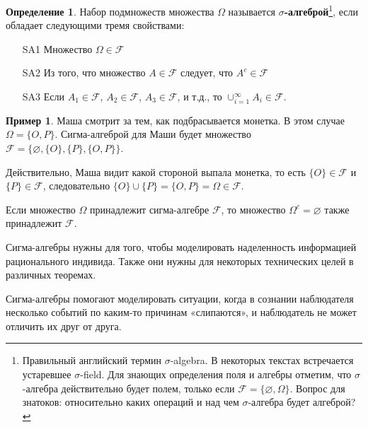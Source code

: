 \documentclass[pdftex, 12pt, a4paper]{article}
\def\F{\ensuremath{\mathcal{F}}} %
\def\s{\ensuremath{\sigma}}
\def \Om{\Omega}
\theoremstyle{definition} %
\newtheorem*{mydef}{Определение}
\newtheorem{myex}{Пример}
\numberwithin{problem}{section}
\newcommand{\indef}[1]{\textbf{#1}}
\numberwithin{blits}{section}
\begin{document}
\begin{mydef} Набор подмножеств множества $\Omega$ называется \indef{$\sigma$-алгеброй}\footnote{Правильный английский термин \s-algebra. В некоторых текстах встречается устаревшее $\sigma$-field. Для знающих определения поля и алгебры отметим, что \s-алгебра действительно будет полем, только если $\mathcal{F}=\{\varnothing,\Omega\}$. Вопрос для знатоков: относительно каких операций и над чем \s-алгебра будет алгеброй? }, \index{$\s$-алгебра}  если обладает следующими тремя свойствами:

\begin{enumerate}
\item[SA1] Множество $\Omega \in \mathcal{F}$

\item[SA2] Из того, что множество $A\in \mathcal{F}$ следует, что $A^{c}\in \mathcal{F}$

\item[SA3] Если $A_{1}\in\mathcal{F}$, $A_{2}\in\mathcal{F}$, $A_{3}\in\mathcal{F}$, и т.д., то $\cup_{i=1}^{\infty} A_{i} \in\mathcal{F}$.
\end{enumerate}
\end{mydef}

\begin{myex}
Маша смотрит за тем, как подбрасывается монетка. В этом случае $\Om = \{O,P\}$. Сигма-алгеброй для Маши будет множество $\F = \{ \varnothing, \{O\},\{P\},\{O,P\}\}$.

Действительно, Маша видит какой стороной выпала монетка, то есть $\{O\} \in \F$ и $\{P\} \in \F$, следовательно $\{O\} \cup \{P\} = \{O,P\}=\Om \in \F$. 

Если множество $\Om$ принадлежит сигма-алгебре $\F$, то множество $\Om^{c} = \varnothing$ также принадлежит $\F$.  

\end{myex}

Сигма-алгебры нужны для того, чтобы моделировать наделенность информацией рационального индивида. Также они нужны для некоторых технических целей в различных теоремах. 

Сигма-алгебры помогают моделировать ситуации, когда в сознании наблюдателя несколько событий по каким-то причинам «слипаются», и наблюдатель не может отличить их друг от друга. 
\end{document}

